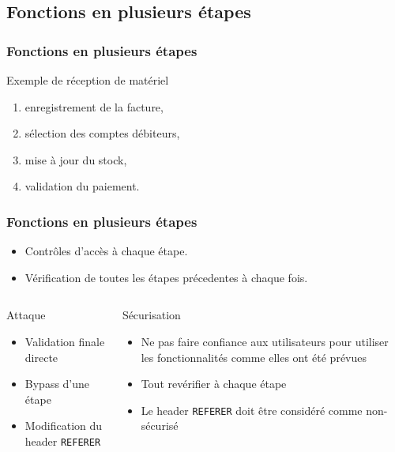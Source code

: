 \documentclass[aspectratio=169]{beamer}  %
\begin{document}
\subsection{Fonctions en plusieurs étapes}
\begin{frame}
  \frametitle{Fonctions en plusieurs étapes}
  \begin{block}{Exemple de réception de matériel}
    \begin{enumerate}
        \item enregistrement de la facture,
        \item sélection des comptes débiteurs,
        \item mise à jour du stock,
        \item validation du paiement.
    \end{enumerate}
  \end{block}
\end{frame}
\begin{frame}
  \frametitle{Fonctions en plusieurs étapes}  
  \begin{itemize}
    \item Contrôles d'accès à chaque étape.
    \item Vérification de toutes les étapes précedentes à chaque fois.
  \end{itemize}
  \begin{columns}[T]
      \begin{alertblock}{Attaque}
        \begin{itemize}
          \item Validation finale directe
          \item Bypass d'une étape
          \item Modification du header \texttt{REFERER}
        \end{itemize}
      \end{alertblock}
      \begin{exampleblock}{Sécurisation}
        \begin{itemize}
          \item Ne pas faire confiance aux utilisateurs pour utiliser les fonctionnalités comme elles ont été prévues
          \item Tout revérifier à chaque étape
          \item Le header \texttt{REFERER} doit être considéré comme non-sécurisé
        \end{itemize}
      \end{exampleblock}
  \end{columns}
  
\end{frame}
\end{document}
